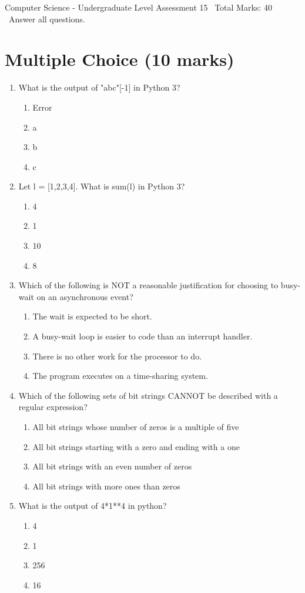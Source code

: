 \documentclass[12pt]{article}
\begin{document}
\begin{center}
Computer Science - Undergraduate Level Assessment 15 \
Total Marks: 40 \
Answer all questions.
\end{center}

\section*{Multiple Choice (10 marks)}
\begin{enumerate}[label=\arabic*.]
\item What is the output of "abc"[-1] in Python 3?
\begin{enumerate}[label=(\alph*)]
    \item Error
    \item a
    \item b
    \item c
\end{enumerate}
\item Let l = [1,2,3,4]. What is sum(l) in Python 3?
\begin{enumerate}[label=(\alph*)]
    \item 4
    \item 1
    \item 10
    \item 8
\end{enumerate}
\item Which of the following is NOT a reasonable justification for choosing to busy-wait on an asynchronous event?
\begin{enumerate}[label=(\alph*)]
    \item The wait is expected to be short.
    \item A busy-wait loop is easier to code than an interrupt handler.
    \item There is no other work for the processor to do.
    \item The program executes on a time-sharing system.
\end{enumerate}
\item Which of the following sets of bit strings CANNOT be described with a regular expression?
\begin{enumerate}[label=(\alph*)]
    \item All bit strings whose number of zeros is a multiple of five
    \item All bit strings starting with a zero and ending with a one
    \item All bit strings with an even number of zeros
    \item All bit strings with more ones than zeros
\end{enumerate}
\item What is the output of 4*1**4 in python?
\begin{enumerate}[label=(\alph*)]
    \item 4
    \item 1
    \item 256
    \item 16
\end{enumerate}
\end{enumerate}
\end{document}
